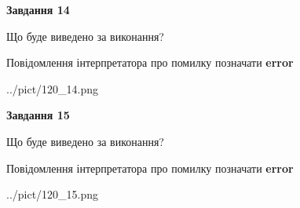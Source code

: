 \documentclass[11pt, ukrainian]{article}
\begin{document}
{\begin {large}
{\begin {center}\textbf{Завдання 14}\end {center}}\par
Що буде виведено за виконання? \par
Повідомлення інтерпретатора про помилку позначати \textbf{error}

\begin{center}
	{../pict/120_14.png}
\end{center}
\newpage

{\begin {center}\textbf{Завдання 15}\end {center}}\par
Що буде виведено за виконання? \par
Повідомлення інтерпретатора про помилку позначати \textbf{error}

\begin{center}
	{../pict/120_15.png}
\end{center}
\newpage

\end {large}}
\end{document}
